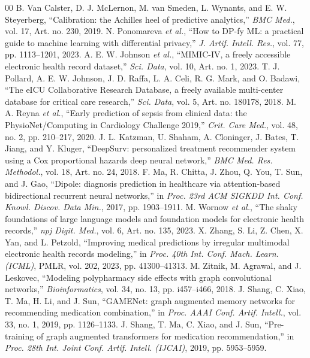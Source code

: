 \documentclass[conference]{IEEEtran}
\begin{document}
\begin{thebibliography}{00}
 B. Van Calster, D. J. McLernon, M. van Smeden, L. Wynants, and E. W. Steyerberg, ``Calibration: the Achilles heel of predictive analytics,'' \textit{BMC Med.}, vol. 17, Art. no. 230, 2019.
 N. Ponomareva \textit{et al.}, ``How to DP-fy ML: a practical guide to machine learning with differential privacy,'' \textit{J. Artif. Intell. Res.}, vol. 77, pp. 1113--1201, 2023.
 A. E. W. Johnson \textit{et al.}, ``MIMIC-IV, a freely accessible electronic health record dataset,'' \textit{Sci. Data}, vol. 10, Art. no. 1, 2023.
 T. J. Pollard, A. E. W. Johnson, J. D. Raffa, L. A. Celi, R. G. Mark, and O. Badawi, ``The eICU Collaborative Research Database, a freely available multi-center database for critical care research,'' \textit{Sci. Data}, vol. 5, Art. no. 180178, 2018.
 M. A. Reyna \textit{et al.}, ``Early prediction of sepsis from clinical data: the PhysioNet/Computing in Cardiology Challenge 2019,'' \textit{Crit. Care Med.}, vol. 48, no. 2, pp. 210--217, 2020.
 J. L. Katzman, U. Shaham, A. Cloninger, J. Bates, T. Jiang, and Y. Kluger, ``DeepSurv: personalized treatment recommender system using a Cox proportional hazards deep neural network,'' \textit{BMC Med. Res. Methodol.}, vol. 18, Art. no. 24, 2018.
 F. Ma, R. Chitta, J. Zhou, Q. You, T. Sun, and J. Gao, ``Dipole: diagnosis prediction in healthcare via attention-based bidirectional recurrent neural networks,'' in \textit{Proc. 23rd ACM SIGKDD Int. Conf. Knowl. Discov. Data Min.}, 2017, pp. 1903--1911.
 M. Wornow \textit{et al.}, ``The shaky foundations of large language models and foundation models for electronic health records,'' \textit{npj Digit. Med.}, vol. 6, Art. no. 135, 2023.
 X. Zhang, S. Li, Z. Chen, X. Yan, and L. Petzold, ``Improving medical predictions by irregular multimodal electronic health records modeling,'' in \textit{Proc. 40th Int. Conf. Mach. Learn. (ICML)}, PMLR, vol. 202, 2023, pp. 41300--41313.
 M. Zitnik, M. Agrawal, and J. Leskovec, ``Modeling polypharmacy side effects with graph convolutional networks,'' \textit{Bioinformatics}, vol. 34, no. 13, pp. i457--i466, 2018.
 J. Shang, C. Xiao, T. Ma, H. Li, and J. Sun, ``GAMENet: graph augmented memory networks for recommending medication combination,'' in \textit{Proc. AAAI Conf. Artif. Intell.}, vol. 33, no. 1, 2019, pp. 1126--1133.
 J. Shang, T. Ma, C. Xiao, and J. Sun, ``Pre-training of graph augmented transformers for medication recommendation,'' in \textit{Proc. 28th Int. Joint Conf. Artif. Intell. (IJCAI)}, 2019, pp. 5953--5959.

\end{thebibliography}
\end{document}
